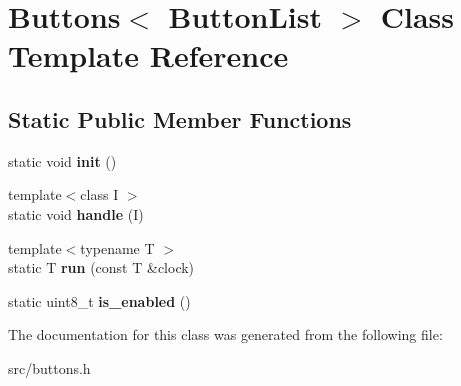 \hypertarget{classButtons}{}\section{Buttons$<$ Button\+List $>$ Class Template Reference}
\label{classButtons}
\subsection*{Static Public Member Functions}
\begin{DoxyCompactItemize}
\item 
\hypertarget{classButtons_a9abcc4273029325408f8a0284434ffe7}{}\label{classButtons_a9abcc4273029325408f8a0284434ffe7} 
static void {\bfseries init} ()
\item 
\hypertarget{classButtons_a91d50739c18ae74d71e0c8821ecb3342}{}\label{classButtons_a91d50739c18ae74d71e0c8821ecb3342} 
{\footnotesize template$<$class I $>$ }\\static void {\bfseries handle} (I)
\item 
\hypertarget{classButtons_a5bb6fe1fdc97ebebb5fc1670d69a5aa0}{}\label{classButtons_a5bb6fe1fdc97ebebb5fc1670d69a5aa0} 
{\footnotesize template$<$typename T $>$ }\\static T {\bfseries run} (const T \&clock)
\item 
\hypertarget{classButtons_a6781d891c54de4b4ce1d27ec15a247c9}{}\label{classButtons_a6781d891c54de4b4ce1d27ec15a247c9} 
static uint8\+\_\+t {\bfseries is\+\_\+enabled} ()
\end{DoxyCompactItemize}


The documentation for this class was generated from the following file\+:\begin{DoxyCompactItemize}
\item 
src/buttons.\+h\end{DoxyCompactItemize}
